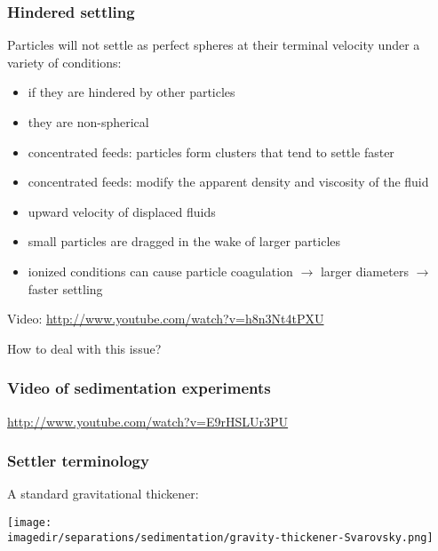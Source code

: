 \begin{frame}\frametitle{Hindered settling}
	Particles will not settle as perfect spheres at their terminal velocity under a variety of conditions:
	\begin{itemize}
		\item	if they are hindered by other particles
		\item	they are non-spherical
		\item	concentrated feeds: particles form clusters that tend to settle faster
		\item	concentrated feeds: modify the apparent density and viscosity of the fluid
		\item	upward velocity of displaced fluids
		\item	small particles are dragged in the wake of larger particles
		\item	ionized conditions can cause particle coagulation $\rightarrow$ larger diameters $\rightarrow$ faster settling
	\end{itemize}
	
	\vspace{12pt}
	Video: \href{http://www.youtube.com/watch?v=h8n3Nt4tPXU}{http://www.youtube.com/watch?v=h8n3Nt4tPXU}
	
	How to deal with this issue?
\end{frame}

\begin{frame}\frametitle{Video of sedimentation experiments}
	\href{http://www.youtube.com/watch?v=E9rHSLUr3PU}{http://www.youtube.com/watch?v=E9rHSLUr3PU}
\end{frame}

%

\begin{frame}\frametitle{Settler terminology}
	A standard gravitational thickener:
	
	\begin{center}
		\texttt{[image: \\imagedir/separations/sedimentation/gravity-thickener-Svarovsky.png]}
	\end{center}
\end{frame}


